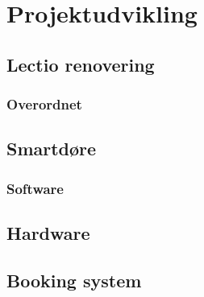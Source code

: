 \section{Projektudvikling \label{sec:Projektudvikling}}
    \subsection{Lectio renovering}
        \subsubsection{Overordnet}
                        
    \subsection{Smartdøre}
        \subsubsection{Software}
        \subsection{Hardware}
    \subsection{Booking system}